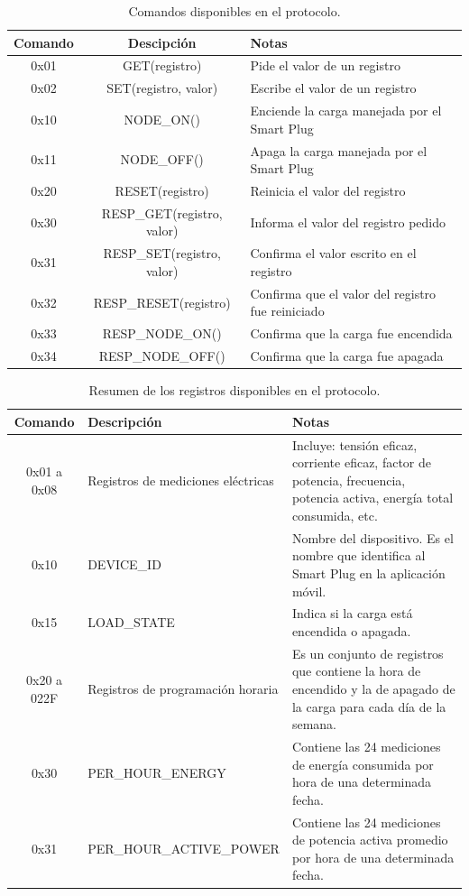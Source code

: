 \begin{table}[h]
	\centering
	\caption[Comandos disponibles en el protocolo]{Comandos disponibles en el protocolo.}
	\begin{tabular}{c c p{6cm}}    
		\toprule
		\textbf{Comando} 	 & \textbf{Descipción}  & \textbf{Notas} \\
		\midrule
		0x01  & GET(registro)  				& Pide el valor de un registro \\		
		0x02  & SET(registro, valor)  		& Escribe el valor de un registro \\
		0x10  & NODE\_ON()  					& Enciende la carga manejada por el Smart Plug \\
		0x11  & NODE\_OFF()  				& Apaga la carga manejada por el Smart Plug \\
		0x20  & RESET(registro)  			& Reinicia el valor del registro \\
		0x30  & RESP\_GET(registro, valor)  	& Informa el valor del registro pedido \\
		0x31  & RESP\_SET(registro, valor)  	& Confirma el valor escrito en el registro \\
		0x32  & RESP\_RESET(registro)  		& Confirma que el valor del registro fue reiniciado \\
		0x33  & RESP\_NODE\_ON()  			& Confirma que la carga fue encendida \\
		0x34  & RESP\_NODE\_OFF()  			& Confirma que la carga fue apagada \\
		\bottomrule
		\hline
	\end{tabular}
	\label{tab:comandos_trama}
\end{table}

\begin{table}[h]
	\centering
	\caption[Resumen de los registros disponibles en el protocolo]{Resumen de los registros disponibles en el protocolo.}
	\begin{tabular}{c p{5cm} p{6cm}}    
		\toprule
		\textbf{Comando} 	 & \textbf{Descripción}  & \textbf{Notas} \\
		\midrule
		0x01 a 0x08  	& Registros de mediciones eléctricas  	& Incluye: tensión eficaz, corriente eficaz, factor de potencia, frecuencia, potencia activa, energía total consumida, etc. \\		
		0x10  			& DEVICE\_ID  							& Nombre del dispositivo. Es el nombre que identifica al Smart Plug en la aplicación móvil. \\
		0x15  			& LOAD\_STATE  							& Indica si la carga está encendida o apagada. \\
		0x20 a 022F  	& Registros de programación horaria  	& Es un conjunto de registros que contiene la hora de encendido y la de apagado de la carga para cada día de la semana. \\
		0x30  			& PER\_HOUR\_ENERGY  						& Contiene las 24 mediciones de energía consumida por hora de una determinada fecha. \\
		0x31  			& PER\_HOUR\_ACTIVE\_POWER  				& Contiene las 24 mediciones de potencia activa promedio por hora de una determinada fecha. \\
		\bottomrule
		\hline
	\end{tabular}
	\label{tab:registros_trama}
\end{table}

